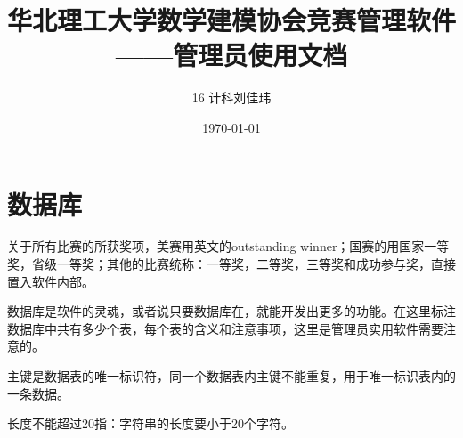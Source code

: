 \documentclass[lang=cn,hazy,screen,blue,14pt]{elegantnote}
\title{华北理工大学数学建模协会竞赛管理软件\\——管理员使用文档}
\author{16 计科刘佳玮}
\institute{Elegant\LaTeX{} Program}
\date{\today}
\begin{document}
\maketitle
\newpage
\tableofcontents
\newpage

\section{数据库}

关于所有比赛的所获奖项，美赛用英文的outstanding winner；国赛的用国家一等奖，省级一等奖；其他的比赛统称：一等奖，二等奖，三等奖和成功参与奖，直接置入软件内部。

数据库是软件的灵魂，或者说只要数据库在，就能开发出更多的功能。在这里标注数据库中共有多少个表，每个表的含义和注意事项，这里是管理员实用软件需要注意的。

\begin{note}
主键是数据表的唯一标识符，同一个数据表内主键不能重复，用于唯一标识表内的一条数据。
\end{note}

\begin{note}
长度不能超过20指：字符串的长度要小于20个字符。
\end{note}
\end{document}
